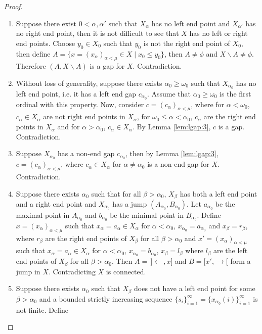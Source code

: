 \documentclass[12pt,oneside,english]{amsbook}
\numberwithin{equation}{section} %
\numberwithin{figure}{section} %
\theoremstyle{plain}
\numberwithin{section}{chapter}
\theoremstyle{plain}
\begin{document}
\begin{proof}
  \begin{enumerate}
  \item Suppose there exist $0< \alpha, \alpha'$ such that $X_{\alpha}$ has no left end point and $X_{\alpha'}$ has no right end point, then it is not difficult to see that $X$ has no left or right end points. Choose $y_0 \in X_{0}$ such that $y_0$ is not the right end point of $X_0$, then define $A = \{x = (x_{\alpha})_{\alpha < \mu} \in X \; | \; x_0 \leq y_0\}$, then $A \neq \phi$ and $X \backslash A \neq \phi$. Therefore $(A,X \backslash A)$ is a gap for $X$. Contradiction.
  \item Without loss of generality, suppose there exists $\alpha_0 \geq \omega_0$ such that $X_{\alpha_0}$ has no left end point, i.e. it has a left end gap $c_{\alpha_0}$. Assume that $\alpha_0 \geq \omega_0$ is the first ordinal with this property. Now, consider $c = (c_{\alpha})_{\alpha < \mu}$, where for $\alpha < \omega_0$, $c_{\alpha} \in X_{\alpha}$ are not right end points in $X_{\alpha}$, for $\omega_0 \leq \alpha < \alpha_0$, $c_{\alpha}$ are the right end points in $X_{\alpha}$ and for $\alpha > \alpha_0$, $c_{\alpha} \in X_{\alpha}$. By Lemma \ref{lem:lgap:3}, $c$ is a gap. Contradiction.
  \item Suppose $X_{\alpha_0}$ has a non-end gap $c_{\alpha_0}$, then by Lemma \ref{lem:lgap:3}, $c = (c_{\alpha})_{\alpha < \mu}$, where $c_{\alpha} \in X_{\alpha}$ for $\alpha \neq \alpha_0$ is a non-end gap for $X$. Contradiction.
  \item Suppose there exists $\alpha_0$ such that for all $\beta > \alpha_0$, $X_{\beta}$ has both a left end point and a right end point and $X_{\alpha_0}$ has a jump $(A_{\alpha_0},B_{\alpha_0})$. Let $a_{\alpha_0}$ be the maximal point in $A_{\alpha_{0}}$ and $b_{\alpha_0}$ be the minimal point in $B_{\alpha_0}$. Define $x = (x_{\alpha})_{\alpha < \mu}$ such that $ x_{\alpha} = a_{\alpha} \in X_{\alpha}$ for $\alpha < \alpha_0$, $x_{\alpha_0} = a_{\alpha_{0}}$ and $x_{\beta} = r_{\beta}$, where $r_{\beta}$ are the right end points of $X_{\beta}$ for all $\beta > \alpha_0$ and $x' = (x_{\alpha})_{\alpha < \mu}$ such that $x_{\alpha} = a_{\alpha} \in X_{\alpha}$ for $\alpha < \alpha_0$, $x_{\alpha_0} = b_{\alpha_{0}}$, $x_{\beta} = l_{\beta}$ where $l_{\beta}$ are the left end points of $X_{\beta}$ for all $\beta > \alpha_0$. Then $A = \, ]\leftarrow, x]$ and $B = [x', \rightarrow[$ form a jump in $X$. Contradicting $X$ is connected.
  \item Suppose there exists $\alpha_0$ such that $X_{\beta}$ does not have a left end point for some $\beta > \alpha_0$ and a bounded strictly increasing sequence $\{s_i\}_{i = 1}^{\infty} = \{x_{\alpha_0}(i)\}_{i = 1}^{\infty}$ is not finite. Define
    

\end{enumerate}
\end{proof}
\end{document}
